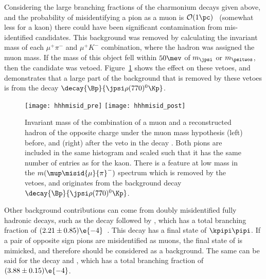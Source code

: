 Considering the large branching fractions of the charmonium decays given above, and the probability of
misidentifying a pion as a muon is $\mathcal{O}(1\pc)$~\cite{LHCb-DP-2013-001} (somewhat less for a
kaon) there could have been significant contamination from mis-identified candidates.
This background was removed by calculating the invariant mass of each $\mu^+\pi^-$ and
$\mu^+K^-$ combination, where the hadron was assigned the muon mass.
If the mass of this object fell within $50\mev$ of $m_\jpsi$ or $m_\psitwos$, then the candidate
was vetoed.
Figure~\ref{fig:hhh:misid} shows the effect on these vetoes, and demonstrates that a large part
of the background that is removed by these vetoes is from the decay
$\decay{\Bp}{\jpsi\rho(770)^0\Kp}$.


\begin{figure}
  \begin{center}
    \texttt{[image: hhhmisid\_pre]}
    \texttt{[image: hhhmisid\_post]}
    \caption[Backgrounds from misidentified charmonia]
    {
      Invariant mass of the combination of a muon and a reconstructed hadron of the opposite charge
      under the muon mass hypothesis (left) before, and (right) after the veto in the decay
      \btokpipimumu.
      Both pions are included in the same histogram and scaled such that it has the same number of
      entries as for the kaon.
      There is a feature at low mass in the $m(\mup\misid{\mu}{\pi}^-)$ spectrum which is removed by the
      vetoes, and originates from the background decay $\decay{\Bp}{\jpsi\rho(770)^0\Kp}$.
    }
    \label{fig:hhh:misid}
  \end{center}
\end{figure}


Other background contributions can come from doubly misidentified fully hadronic decays, such as
the decay \decay{\Bd}{\Dzb\pip\pipi} followed by \decay{\Dzb}{\kpi}, which
has a total branching fraction of $(2.21\pm0.85)\e{-4}$~\cite{PDG2012}.
This decay has a final state of $\kpipi\pipi$.
If a pair of opposite sign pions are misidentified
as muons, the final state of \kpipimumu is mimicked, and therefore should be considered as a
background.
The same can be said for the decay \decay{\Bd}{\Dzb\pip} and \decay{\Dzb}{\Km\pip\pipi},
which has a total branching fraction of $(3.88\pm0.15)\e{-4}$.

